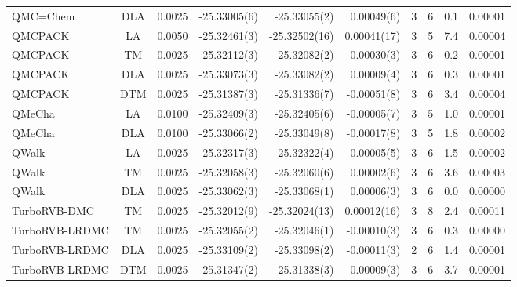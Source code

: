 \begin{tabular}{|lc|lr|r|r|cccc|}
QMC=Chem         &  DLA  & 0.0025 & -25.33005(6) & -25.33055(2) & 0.00049(6) & 3 & 6 & 0.1 & 0.00001 \\
QMCPACK          &  LA   & 0.0050 & -25.32461(3) & -25.32502(16) & 0.00041(17) & 3 & 5 & 7.4 & 0.00004 \\
QMCPACK          &  TM   & 0.0025 & -25.32112(3) & -25.32082(2) & -0.00030(3) & 3 & 6 & 0.2 & 0.00001 \\
QMCPACK          &  DLA  & 0.0025 & -25.33073(3) & -25.33082(2) & 0.00009(4) & 3 & 6 & 0.3 & 0.00001 \\
QMCPACK          &  DTM  & 0.0025 & -25.31387(3) & -25.31336(7) & -0.00051(8) & 3 & 6 & 3.4 & 0.00004 \\
QMeCha           &  LA   & 0.0100 & -25.32409(3) & -25.32405(6) & -0.00005(7) & 3 & 5 & 1.0 & 0.00001 \\
QMeCha           &  DLA  & 0.0100 & -25.33066(2) & -25.33049(8) & -0.00017(8) & 3 & 5 & 1.8 & 0.00002 \\
QWalk            &  LA   & 0.0025 & -25.32317(3) & -25.32322(4) & 0.00005(5) & 3 & 6 & 1.5 & 0.00002 \\
QWalk            &  TM   & 0.0025 & -25.32058(3) & -25.32060(6) & 0.00002(6) & 3 & 6 & 3.6 & 0.00003 \\
QWalk            &  DLA  & 0.0025 & -25.33062(3) & -25.33068(1) & 0.00006(3) & 3 & 6 & 0.0 & 0.00000 \\
TurboRVB-DMC     &  TM   & 0.0025 & -25.32012(9) & -25.32024(13) & 0.00012(16) & 3 & 8 & 2.4 & 0.00011 \\
TurboRVB-LRDMC   &  TM   & 0.0025 & -25.32055(2) & -25.32046(1) & -0.00010(3) & 3 & 6 & 0.3 & 0.00000 \\
TurboRVB-LRDMC   &  DLA  & 0.0025 & -25.33109(2) & -25.33098(2) & -0.00011(3) & 2 & 6 & 1.4 & 0.00001 \\
TurboRVB-LRDMC   &  DTM  & 0.0025 & -25.31347(2) & -25.31338(3) & -0.00009(3) & 3 & 6 & 3.7 & 0.00001 \\
\bottomrule
\end{tabular}
